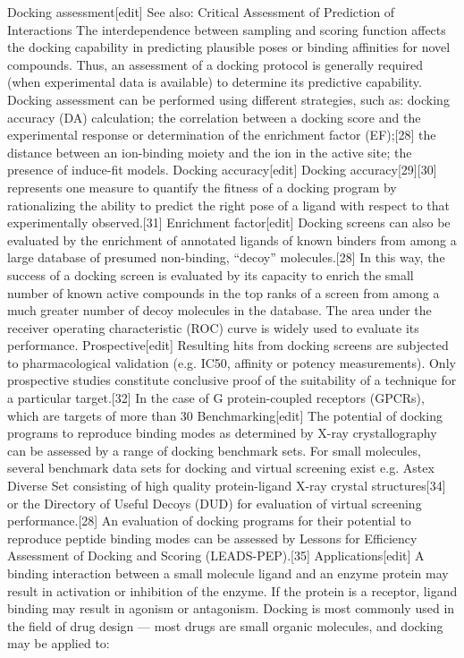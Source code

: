 Docking assessment[edit]
See also: Critical Assessment of Prediction of Interactions
The interdependence between sampling and scoring function affects the docking capability in predicting plausible poses or binding affinities for novel compounds. Thus, an assessment of a docking protocol is generally required (when experimental data is available) to determine its predictive capability. Docking assessment can be performed using different strategies, such as:
docking accuracy (DA) calculation;
the correlation between a docking score and the experimental response or determination of the enrichment factor (EF);[28]
the distance between an ion-binding moiety and the ion in the active site;
the presence of induce-fit models.
Docking accuracy[edit]
Docking accuracy[29][30] represents one measure to quantify the fitness of a docking program by rationalizing the ability to predict the right pose of a ligand with respect to that experimentally observed.[31]
Enrichment factor[edit]
Docking screens can also be evaluated by the enrichment of annotated ligands of known binders from among a large database of presumed non-binding, “decoy” molecules.[28] In this way, the success of a docking screen is evaluated by its capacity to enrich the small number of known active compounds in the top ranks of a screen from among a much greater number of decoy molecules in the database. The area under the receiver operating characteristic (ROC) curve is widely used to evaluate its performance.
Prospective[edit]
Resulting hits from docking screens are subjected to pharmacological validation (e.g. IC50, affinity or potency measurements). Only prospective studies constitute conclusive proof of the suitability of a technique for a particular target.[32] In the case of G protein-coupled receptors (GPCRs), which are targets of more than 30%
Benchmarking[edit]
The potential of docking programs to reproduce binding modes as determined by X-ray crystallography can be assessed by a range of docking benchmark sets.
For small molecules, several benchmark data sets for docking and virtual screening exist e.g. Astex Diverse Set consisting of high quality protein-ligand X-ray crystal structures[34] or the Directory of Useful Decoys (DUD) for evaluation of virtual screening performance.[28]
An evaluation of docking programs for their potential to reproduce peptide binding modes can be assessed by Lessons for Efficiency Assessment of Docking and Scoring (LEADS-PEP).[35]
Applications[edit]
A binding interaction between a small molecule ligand and an enzyme protein may result in activation or inhibition of the enzyme. If the protein is a receptor, ligand binding may result in agonism or antagonism. Docking is most commonly used in the field of drug design — most drugs are small organic molecules, and docking may be applied to:
